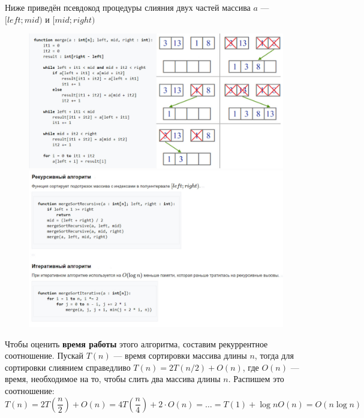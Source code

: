 \newpage 
Ниже приведён псевдокод процедуры слияния двух частей массива $a$ — $[left;mid)$ и $[mid;right)$
\begin{figure}[h]
\centering
\includegraphics[width=1\linewidth]{images/13_pic1.jpg}
\includegraphics[width=1\linewidth]{images/13_pic3.jpg}
\end{figure}
\par Чтобы оценить \textbf{время работы} этого алгоритма, составим рекуррентное соотношение. Пускай $T(n)$ — время сортировки массива длины $n$, тогда для сортировки слиянием справедливо $T(n)=2T(n/2)+O(n)$, где $O(n)$ — время, необходимое на то, чтобы слить два массива длины $n$. Распишем это соотношение:
$$T(n)=2T(\frac{n}{2})+O(n)=4T(\frac{n}{4})+2\cdot O(n)=\ldots=T(1)+\log{n}O(n)=O(n\log{n})$$

\newpage \setcounter{section}{13}
